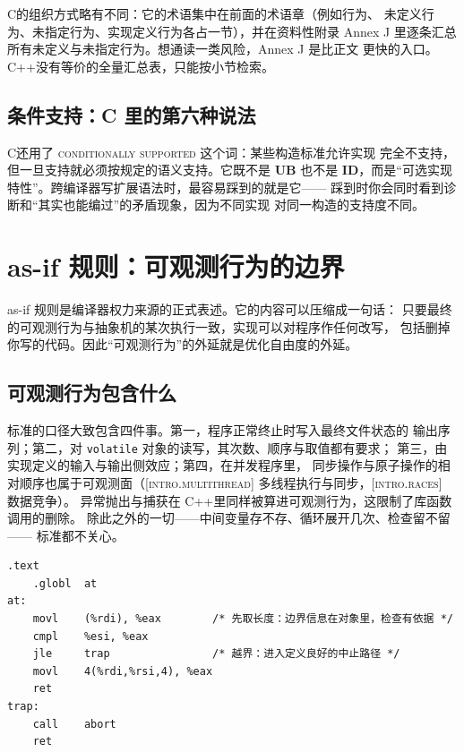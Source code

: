 \documentclass[12pt,a4paper,fontset=fandol]{ctexbook}
\newcommand{\Tp}[1]{\texttt{#1}}
\newcommand{\Lang}[1]{\textsf{#1}}
\newcommand{\CL}{\Lang{C}}
\newcommand{\CPP}{\Lang{C++}}
\newcommand{\UB}{\textbf{\textsf{UB}}}
\newcommand{\IDB}{\textbf{\textsf{ID}}}
\newcommand{\Std}[1]{\textsc{[#1]}}
\newcommand{\Clause}[1]{\textsc{\small #1}}
\begin{document}
\CL 的组织方式略有不同：它的术语集中在前面的术语章（例如行为、
未定义行为、未指定行为、实现定义行为各占一节），并在资料性附录 Annex J
里逐条汇总所有未定义与未指定行为。想通读一类风险，Annex J 是比正文
更快的入口。\CPP 没有等价的全量汇总表，只能按小节检索。

\subsection{条件支持：C 里的第六种说法}\label{sec:ub01-cond-supported}

\CL 还用了 \Clause{conditionally supported} 这个词：某些构造标准允许实现
完全不支持，但一旦支持就必须按规定的语义支持。它既不是 \UB{} 也不是
\IDB{}，而是“可选实现特性”。跨编译器写扩展语法时，最容易踩到的就是它——
踩到时你会同时看到诊断和“其实也能编过”的矛盾现象，因为不同实现
对同一构造的支持度不同。

\section{as-if 规则：可观测行为的边界}\label{sec:ub01-asif}

as-if 规则是编译器权力来源的正式表述。它的内容可以压缩成一句话：
只要最终的可观测行为与抽象机的某次执行一致，实现可以对程序作任何改写，
包括删掉你写的代码。因此“可观测行为”的外延就是优化自由度的外延。

\subsection{可观测行为包含什么}\label{sec:ub01-observable}

标准的口径大致包含四件事。第一，程序正常终止时写入最终文件状态的
输出序列；第二，对 \Tp{volatile} 对象的读写，其次数、顺序与取值都有要求；
第三，由实现定义的输入与输出侧效应；第四，在并发程序里，
同步操作与原子操作的相对顺序也属于可观测面（\Std{intro.multithread}
\Clause{多线程执行与同步}，\Std{intro.races} \Clause{数据竞争}）。
异常抛出与捕获在 \CPP 里同样被算进可观测行为，这限制了库函数调用的删除。
除此之外的一切——中间变量存不存、循环展开几次、检查留不留——
标准都不关心。

\begin{lstlisting}[style=asmstyle, caption={示意：边界检查留在指令流里，越界走定义良好的中止路径（说明性写法，非本册实测反汇编）}]
    .text
    .globl  at
at:
    movl    (%rdi), %eax        /* 先取长度：边界信息在对象里，检查有依据 */
    cmpl    %esi, %eax
    jle     trap                /* 越界：进入定义良好的中止路径 */
    movl    4(%rdi,%rsi,4), %eax
    ret
trap:
    call    abort
    ret
\end{lstlisting}
\end{document}
